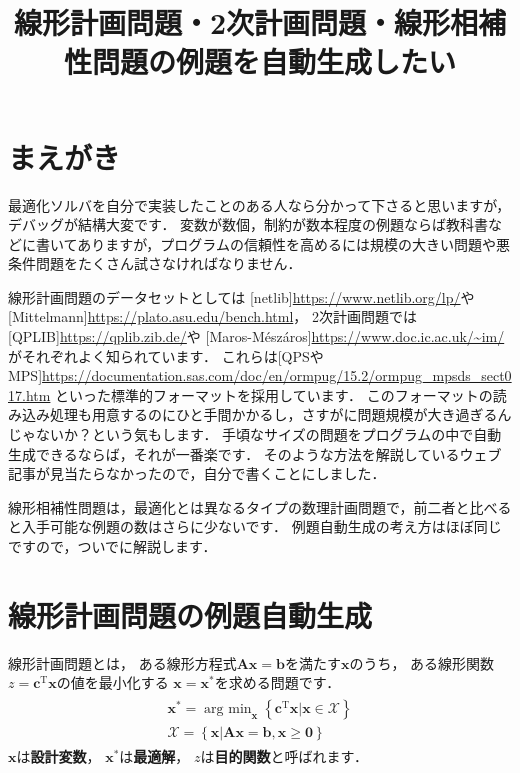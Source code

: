 ﻿\documentclass[a4paper]{jsarticle}
\title{線形計画問題・2次計画問題・線形相補性問題の例題を自動生成したい}
\begin{document}
\maketitle

\section{まえがき}

最適化ソルバを自分で実装したことのある人なら分かって下さると思いますが，デバッグが結構大変です．
変数が数個，制約が数本程度の例題ならば教科書などに書いてありますが，プログラムの信頼性を高めるには規模の大きい問題や悪条件問題をたくさん試さなければなりません．

線形計画問題のデータセットとしては
[netlib]\url{https://www.netlib.org/lp/}や
[Mittelmann]\url{https://plato.asu.edu/bench.html}，
2次計画問題では[QPLIB]\url{https://qplib.zib.de/}や
[Maros-Mészáros]\url{https://www.doc.ic.ac.uk/~im/}
がそれぞれよく知られています．
これらは[QPSやMPS]\url{https://documentation.sas.com/doc/en/ormpug/15.2/ormpug_mpsds_sect017.htm}
といった標準的フォーマットを採用しています．
このフォーマットの読み込み処理も用意するのにひと手間かかるし，さすがに問題規模が大き過ぎるんじゃないか？という気もします．
手頃なサイズの問題をプログラムの中で自動生成できるならば，それが一番楽です．
そのような方法を解説しているウェブ記事が見当たらなかったので，自分で書くことにしました．

線形相補性問題は，最適化とは異なるタイプの数理計画問題で，前二者と比べると入手可能な例題の数はさらに少ないです．
例題自動生成の考え方はほぼ同じですので，ついでに解説します．


\section{線形計画問題の例題自動生成}

線形計画問題とは，
ある線形方程式$\boldsymbol{A}\boldsymbol{x}=\boldsymbol{b}$を満たす$\boldsymbol{x}$のうち，
ある線形関数$z=\boldsymbol{c}^{\mathrm{T}}\boldsymbol{x}$の値を最小化する
$\boldsymbol{x}=\boldsymbol{x}^{*}$を求める問題です．
\begin{align}
\begin{array}{c}
\boldsymbol{x}^{*}=\mathop{\mathrm{arg~min}}_{\boldsymbol{x}}\left\{\boldsymbol{c}^{\mathrm{T}}\boldsymbol{x}
\left|\boldsymbol{x}\in\mathcal{X}\right.
\right\}
\\
\mathcal{X}=\left\{\boldsymbol{x}\left|
\boldsymbol{A}\boldsymbol{x}=\boldsymbol{b},
\boldsymbol{x}\geq\boldsymbol{0}
\right.
\right\}
\end{array}
\label{pb:lp}
\end{align}
$\boldsymbol{x}$は{\bf 設計変数}，
$\boldsymbol{x}^{*}$は{\bf 最適解}，
$z$は{\bf 目的関数}と呼ばれます．
\end{document}
